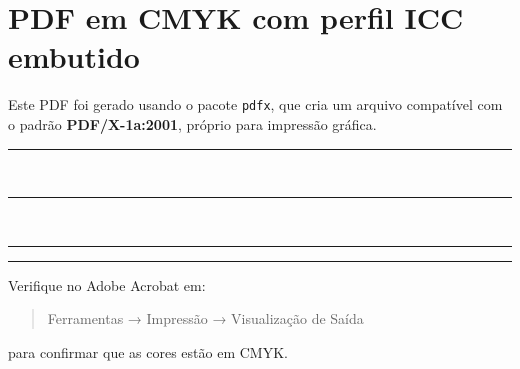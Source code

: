 \documentclass[a4paper,12pt]{article}
\begin{document}
\section*{PDF em CMYK com perfil ICC embutido}

Este PDF foi gerado usando o pacote \texttt{pdfx}, que cria um arquivo
compatível com o padrão \textbf{PDF/X-1a:2001}, próprio para impressão gráfica.

\vspace{1cm}

\textcolor{meuazul}{\rule{10cm}{1cm}}\\[4pt]
\textcolor{meuvermelho}{\rule{10cm}{1cm}}\\[4pt]
\textcolor{meupreto}{\rule{10cm}{1cm}}
\textcolor{meupreto}{\rule{10cm}{1cm}}

\vspace{1cm}
Verifique no Adobe Acrobat em:
\begin{quote}
Ferramentas → Impressão → Visualização de Saída
\end{quote}
para confirmar que as cores estão em CMYK.
\end{document}
